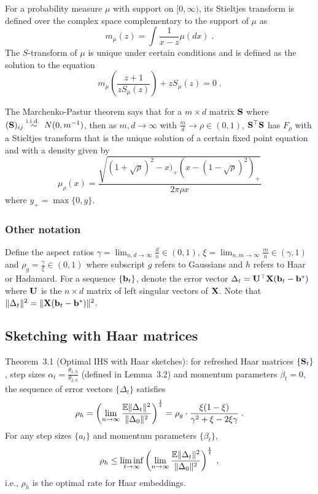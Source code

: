 \documentclass[10pt]{article}
\begin{document}
For a probability measure $\mu$ with support on $[0,\infty)$, its Stieltjes transform is defined over the complex space complementary to the support of $\mu$ as
\[
m_\mu(z) = \int \frac{1}{x-z}\mu(dx) \;.
\]
The $S$-transform of $\mu$ is unique under certain conditions and is defined as the solution to the equation
\[
m_\mu\left(\frac{z+1}{zS_\mu(z)}\right) + zS_\mu(z) = 0\;.
\]

The Marchenko-Pastur theorem says that for a $m\times d$ matrix $\mathbf{S}$ where $(\mathbf{S})_{ij}\overset{\text{i.i.d.\ }}{\sim}N(0,m^{-1})$, then as $m,d\rightarrow\infty$ with $\frac{m}{d}\rightarrow\rho\in(0,1)$, $\mathbf{S}^\top\mathbf{S}$ has \lsd $F_\rho$ with a Stieltjes transform that is the unique solution of a certain fixed point equation and with a density given by
\[
\mu_\rho(x) = \frac{\sqrt{(1+\sqrt{\rho})^2-x)_+(x-(1-\sqrt{\rho})^2)_+}}{2\pi\rho x}
\]
where $y_+=\max\{0,y\}$.


\subsubsection{Other notation}

Define the aspect ratios $\gamma = \lim_{n,d\rightarrow\infty}\frac{d}{n}\in(0,1)$, $\xi = \lim_{n,m\rightarrow\infty}\frac{m}{n}\in(\gamma,1)$ and $\rho_g=\frac{\gamma}{\xi}\in(0,1)$ where subscript $g$ refers to Gaussians and $h$ refers to Haar or Hadamard. For a sequence $\{\mathbf{b}_t\}$, denote the error vector $\Delta_t = \mathbf{U}^\top\mathbf{X}(\mathbf{b}_t-\mathbf{b}^*)$ where $\mathbf{U}$ is the $n\times d$ matrix of left singular vectors of $\mathbf{X}$. Note that $\|\Delta_t\|^2 = \|\mathbf{X}(\mathbf{b}_t-\mathbf{b}^*)\|^2$.


\subsection{Sketching with Haar matrices}

Theorem~3.1 (Optimal IHS with Haar sketches): for refreshed Haar matrices $\{\mathbf{S}_t\}$, step sizes $\alpha_t=\frac{\theta_{1,h}}{\theta_{2,h}}$ (defined in Lemma~3.2) and momentum parameters $\beta_t=0$, the sequence of error vectors $\{\Delta_t\}$ satisfies
\[
\rho_h = \left(\lim_{n\rightarrow\infty}\frac{\mathbb{E}\|\Delta_t\|^2}{\|\Delta_0\|^2}\right)^\frac{1}{t} = \rho_g\cdot\frac{\xi(1-\xi)}{\gamma^2+\xi-2\xi\gamma} \;.
\]
For any step sizes $\{a_t\}$ and momentum parameters $\{\beta_t\}$,
\[
\rho_h \leq \liminf_{t\rightarrow\infty}\left(\lim_{n\rightarrow\infty}\frac{\mathbb{E}\|\Delta_t\|^2}{\|\Delta_0\|^2}\right)^\frac{1}{t} \;,
\]
i.e., $\rho_h$ is the optimal rate for Haar embeddings.
\\
\end{document}
